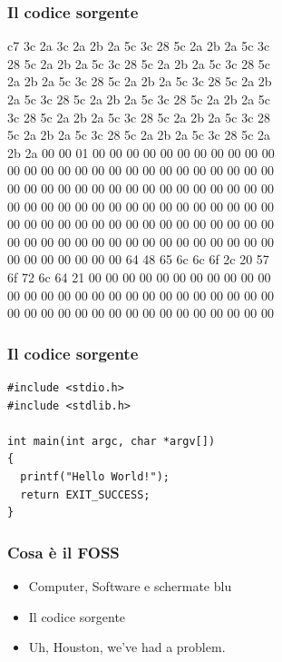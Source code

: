\documentclass{beamer}
\begin{document}
\begin{frame}
  \frametitle{Il codice sorgente}
  \fontsize{12}{7.2}\selectfont
  \begin{center}
c7 3c 2a 3c 2a 2b 2a 5c 3c 28 5c 2a 2b 2a 5c 3c\\
28 5c 2a 2b 2a 5c 3c 28 5c 2a 2b 2a 5c 3c 28 5c\\
2a 2b 2a 5c 3c 28 5c 2a 2b 2a 5c 3c 28 5c 2a 2b\\
2a 5c 3c 28 5c 2a 2b 2a 5c 3c 28 5c 2a 2b 2a 5c\\
3c 28 5c 2a 2b 2a 5c 3c 28 5c 2a 2b 2a 5c 3c 28\\
5c 2a 2b 2a 5c 3c 28 5c 2a 2b 2a 5c 3c 28 5c 2a\\
2b 2a 00 00 01 00 00 00 00 00 00 00 00 00 00 00\\
00 00 00 00 00 00 00 00 00 00 00 00 00 00 00 00\\
00 00 00 00 00 00 00 00 00 00 00 00 00 00 00 00\\
00 00 00 00 00 00 00 00 00 00 00 00 00 00 00 00\\
00 00 00 00 00 00 00 00 00 00 00 00 00 00 00 00\\
00 00 00 00 00 00 00 00 00 00 00 00 00 00 00 00\\
00 00 00 00 00 00 00 64 48 65 6c 6c 6f 2c 20 57\\
6f 72 6c 64 21 00 00 00 00 00 00 00 00 00 00 00\\
00 00 00 00 00 00 00 00 00 00 00 00 00 00 00 00\\
00 00 00 00 00 00 00 00 00 00 00 00 00 00 00 00
  \end{center}

\end{frame}


\begin{frame}[fragile]
  \frametitle{Il codice sorgente}
  
  \begin{verbatim}
#include <stdio.h>
#include <stdlib.h>

int main(int argc, char *argv[])
{
  printf("Hello World!");
  return EXIT_SUCCESS;
}
  \end{verbatim}

\end{frame}

\begin{frame}
  \frametitle{Cosa \`e il FOSS}

  \begin{itemize}
    \item Computer, Software e schermate blu
    \item Il codice sorgente
    \item Uh, Houston, we've had a problem.
  \end{itemize}

\end{frame}
\end{document}
